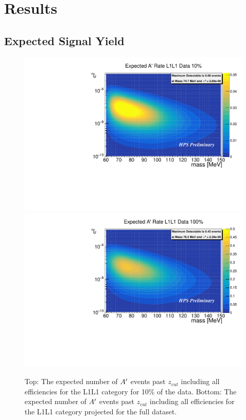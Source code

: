 \clearpage

\section{Results}\label{sec:results}

\subsection{Expected Signal Yield}\label{sec:signalyeild}


\begin{figure}[t]
    \centering
    \includegraphics[width=.85\textwidth]{figs/Results/ap_rate_L1L1.pdf}
    \includegraphics[width=.85\textwidth]{figs/Results/ap_rate_L1L1_unblind.pdf}
    \caption{Top: The expected number of $A^\prime$ events past $z_{cut}$ including all efficiencies for the L1L1 category for 10\% of the data. Bottom: The expected number of $A^\prime$ events past $z_{cut}$ including all efficiencies for the L1L1 category projected for the full dataset.}
    \label{fig:sigyield_L1L1}
\end{figure}

